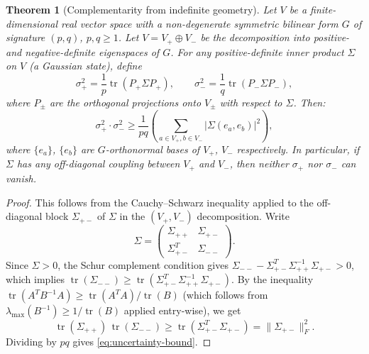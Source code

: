 \documentclass[12pt,a4paper]{article}
\newtheorem{theorem}{Theorem}[section]
\theoremstyle{definition}
\newcommand{\tr}{\operatorname{tr}}
\begin{document}
\begin{theorem}[Complementarity from indefinite geometry]
  \label{thm:uncertainty}
  Let $V$ be a finite-dimensional real vector space with a
  non-degenerate symmetric bilinear form $G$ of signature $(p, q)$,
  $p, q \geq 1$. Let $V = V_+ \oplus V_-$ be the decomposition
  into positive- and negative-definite eigenspaces of $G$. For
  any positive-definite inner product $\Sigma$ on $V$ (a Gaussian
  state), define
  \begin{equation}
    \sigma_+^2 = \frac{1}{p}\tr(P_+ \Sigma P_+), \qquad
    \sigma_-^2 = \frac{1}{q}\tr(P_- \Sigma P_-),
  \end{equation}
  where $P_\pm$ are the orthogonal projections onto $V_\pm$ with
  respect to $\Sigma$. Then:
  \begin{equation}
    \label{eq:uncertainty-bound}
    \sigma_+^2 \cdot \sigma_-^2
    \geq \frac{1}{pq}\left(
      \sum_{a \in V_+, b \in V_-} |\Sigma(e_a, e_b)|^2
    \right),
  \end{equation}
  where $\{e_a\}$, $\{e_b\}$ are $G$-orthonormal bases of $V_+$, $V_-$
  respectively. In particular, if $\Sigma$ has any off-diagonal coupling
  between $V_+$ and $V_-$, then neither $\sigma_+$ nor $\sigma_-$ can
  vanish.
\end{theorem}

\begin{proof}
This follows from the Cauchy--Schwarz inequality applied to the
off-diagonal block $\Sigma_{+-}$ of $\Sigma$ in the $(V_+, V_-)$
decomposition. Write
\begin{equation}
  \Sigma = \begin{pmatrix}
    \Sigma_{++} & \Sigma_{+-} \\
    \Sigma_{+-}^T & \Sigma_{--}
  \end{pmatrix}.
\end{equation}
Since $\Sigma > 0$, the Schur complement condition gives
$\Sigma_{--} - \Sigma_{+-}^T \Sigma_{++}^{-1} \Sigma_{+-} > 0$,
which implies
$\tr(\Sigma_{--}) \geq
\tr(\Sigma_{+-}^T \Sigma_{++}^{-1} \Sigma_{+-})$.
By the inequality
$\tr(A^T B^{-1} A) \geq \tr(A^T A) / \tr(B)$ (which follows from
$\lambda_{\max}(B^{-1}) \geq 1/\tr(B)$ applied entry-wise), we get
\begin{equation}
  \tr(\Sigma_{++})\, \tr(\Sigma_{--})
  \geq \tr(\Sigma_{+-}^T \Sigma_{+-})
  = \|\Sigma_{+-}\|_F^2.
\end{equation}
Dividing by $pq$ gives \eqref{eq:uncertainty-bound}.
\end{proof}
\end{document}
